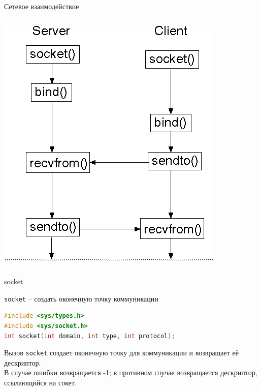 \begin{frame}{Сетевое взаимодействие}
\begin{columns}
	\begin{center}
		\includegraphics[height=0.6\textheight]{06-udp_seq.png}
	\end{center}

\end{columns}
\end{frame}

\begin{frame}[fragile]{socket}

{\tt socket} -- создать оконечную точку коммуникации   

\scriptsize\begin{lstlisting}[language=C]
#include <sys/types.h> 
#include <sys/socket.h> 
int socket(int domain, int type, int protocol);   
\end{lstlisting}

Вызов {\tt socket} создает оконечную точку для коммуникации и возвращает её дескриптор.\\
В случае ошибки возвращается -1; в противном случае возвращается дескриптор, ссылающийся на сокет. 
\end{frame}

